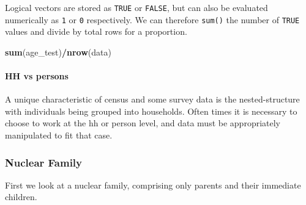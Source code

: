 \documentclass[
]{book}
\newenvironment{Shaded}{\begin{snugshade}}{\end{snugshade}}
\newcommand{\FunctionTok}[1]{\textcolor[rgb]{0.13,0.29,0.53}{\textbf{#1}}}
\newcommand{\NormalTok}[1]{#1}
\newcommand{\OtherTok}[1]{\textcolor[rgb]{0.56,0.35,0.01}{#1}}
\newcommand{\SpecialCharTok}[1]{\textcolor[rgb]{0.81,0.36,0.00}{\textbf{#1}}}
\begin{document}
Logical vectors are stored as \texttt{TRUE} or \texttt{FALSE}, but can also be evaluated numerically as \texttt{1} or \texttt{0} respectively. We can therefore \texttt{sum()} the number of \texttt{TRUE} values and divide by total rows for a proportion.

\begin{Shaded}
\begin{Highlighting}[]
\FunctionTok{sum}\NormalTok{(age\_test)}\SpecialCharTok{/}\FunctionTok{nrow}\NormalTok{(data)}
\end{Highlighting}
\end{Shaded}

\hypertarget{hh-vs-persons}{%
\paragraph*{HH vs persons}\label{hh-vs-persons}}

A unique characteristic of census and some survey data is the nested-structure with individuals being grouped into households. Often times it is necessary to choose to work at the hh or person level, and data must be appropriately manipulated to fit that case.

\begin{Shaded}
\end{Shaded}

\hypertarget{nuclear-family}{%
\subsubsection*{Nuclear Family}\label{nuclear-family}}

First we look at a nuclear family, comprising only parents and their immediate children.
\end{document}
